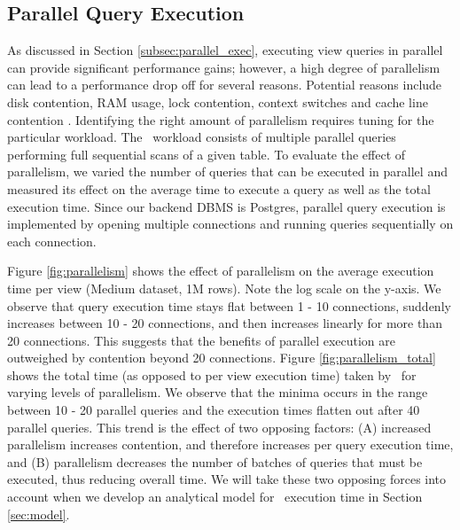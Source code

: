 \subsection {Parallel Query Execution}
As discussed in Section \ref{subsec:parallel_exec}, executing view queries in
parallel can provide significant performance gains; however, a high degree of
parallelism can lead to a performance drop off for several reasons. Potential
reasons include disk contention, RAM usage, lock contention, context switches
and cache line contention
\cite{Postgres_wiki}.
Identifying the right amount of parallelism requires tuning for the particular
workload. The \SeeDB\ workload consists of multiple parallel queries performing
full sequential scans of a given table. To evaluate the
effect of parallelism, we varied the number of queries that can be executed in
parallel and measured its effect on the average time to execute a query as well
as the total execution time. Since our backend DBMS is Postgres, parallel query
execution is implemented by opening multiple connections and running queries
sequentially on each connection.

Figure \ref{fig:parallelism} shows the effect of parallelism on the average
execution time per view (Medium dataset, 1M rows). Note the log scale on the
y-axis.
We observe that query execution time stays flat between 1 - 10 connections, suddenly increases between
10 - 20 connections, and then increases linearly for more than 20 connections.
This suggests that the benefits of parallel execution are outweighed by
contention beyond 20 connections. Figure \ref{fig:parallelism_total} shows the
total time (as opposed to per view execution time) taken by \SeeDB\ for varying
levels of parallelism. We observe that the minima occurs in the range between 10
- 20 parallel queries and the execution times flatten out after 40 parallel
queries.
This trend is the effect of two opposing factors: (A) increased parallelism
increases contention, and therefore increases per query execution time, and (B)
parallelism decreases the number of batches of queries that must be executed,
thus reducing overall time.
We will take these two opposing forces into account when we develop an
analytical model for \SeeDB\ execution time in Section \ref{sec:model}.

